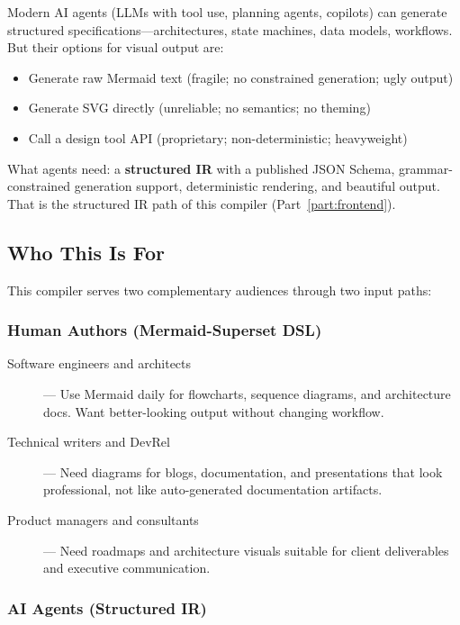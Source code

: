 Modern AI agents (LLMs with tool use, planning agents, copilots) can generate structured
specifications---architectures, state machines, data models, workflows. But their options
for visual output are:

\begin{itemize}
  \item Generate raw Mermaid text (fragile; no constrained generation; ugly output)
  \item Generate SVG directly (unreliable; no semantics; no theming)
  \item Call a design tool API (proprietary; non-deterministic; heavyweight)
\end{itemize}

What agents need: a \textbf{structured IR} with a published JSON Schema, grammar-constrained
generation support, deterministic rendering, and beautiful output. That is the structured IR
path of this compiler (Part~\ref{part:frontend}).

\subsection{Who This Is For}

This compiler serves two complementary audiences through two input paths:

\subsubsection{Human Authors (Mermaid-Superset DSL)}

\begin{description}
  \item[Software engineers and architects] --- Use Mermaid daily for flowcharts, sequence diagrams, and architecture docs. Want better-looking output without changing workflow.
  
  \item[Technical writers and DevRel] --- Need diagrams for blogs, documentation, and presentations that look professional, not like auto-generated documentation artifacts.
  
  \item[Product managers and consultants] --- Need roadmaps and architecture visuals suitable for client deliverables and executive communication.
\end{description}

\subsubsection{AI Agents (Structured IR)}

